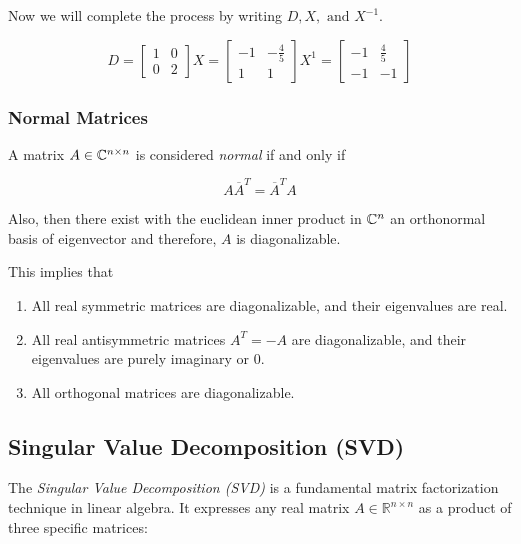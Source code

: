 Now we will complete the process by writing \(D, X, \text{ and } X^{-1}\).

\[
    D = \begin{bmatrix}
        1 & 0 \\
        0 & 2
    \end{bmatrix}
    X = \begin{bmatrix}
        -1  & -\frac{4}{5} \\
        1   &   1 
    \end{bmatrix}
    X^{1} = \begin{bmatrix}
        -1  & \frac{4}{5} \\
        -1   &   -1 
    \end{bmatrix}
\]

\subsubsection{Normal Matrices}

A matrix \(A \in \mathbb{C}^{n \times n}\) is considered \emph{normal} if and only if 

\[
    A \overline{A}^{T} = \overline{A}^T A
\]  

Also, then there exist with the euclidean inner product in \(\mathbb{C}^n\) an orthonormal basis 
of eigenvector and therefore, \(A\) is diagonalizable.

This implies that

\begin{enumerate}
    
    \item All real symmetric matrices are diagonalizable, and their eigenvalues are real.
    
    \item All real antisymmetric matrices \(A^T = -A\) are diagonalizable, and their eigenvalues are 
          purely imaginary or 0. 

    \item All orthogonal matrices are diagonalizable.

\end{enumerate}

\subsection{Singular Value Decomposition (SVD)}

The \emph{Singular Value Decomposition (SVD)} is a fundamental matrix factorization technique in linear 
algebra. It expresses any real matrix \( A \in \mathbb{R}^{n \times n} \) as a product of three specific 
matrices:


